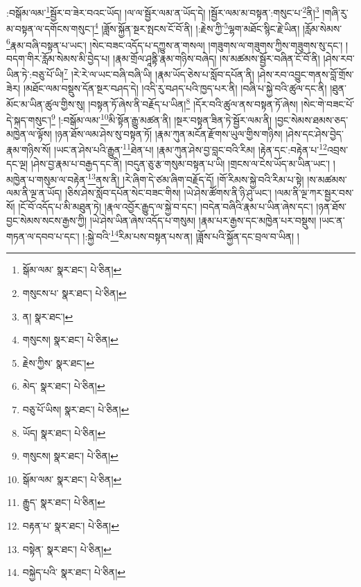:བསྒོམ་ལམ་\footnote{སྒོམ་ལམ་  སྣར་ཐང་།  པེ་ཅིན། }སྦྱོར་བ་ཟེར་བའང་ཡོད། །ལ་ལ་སྦྱོར་ལམ་ན་ཡོད་དེ། །སྦྱོར་ལམ་མ་བསྟན་:གསུང་པ་\footnote{གསུངས་པ་  སྣར་ཐང་།  པེ་ཅིན། }ནི།\footnote{ན།  སྣར་ཐང་། } །གཞི་རུ་མ་བསྟན་ལ་དགོངས་གསུང་།\footnote{གསུངས།  སྣར་ཐང་།  པེ་ཅིན། } །ཟློས་སྐྱོན་སྔར་སྤངས་ངོ་བོ་ནི། །:རྗེས་ཀྱི་\footnote{རྗེས་ཀྱིས་  སྣར་ཐང་། }ལྷག་མཐོང་སྙིང་རྗེ་ཡིན། །རློམ་སེམས་\footnote{མེད་  སྣར་ཐང་།  པེ་ཅིན། }རྣམ་བཞི་བསྟན་པ་ཡང་། །སེང་བཟང་འདོད་པ་དཀྱུས་ན་གསལ། །གཟུགས་ལ་གཟུགས་ཀྱིས་གཟུགས་སུ་དང་། །བདག་གིར་རློམ་སེམས་མི་བྱེད་པ། །རྣམ་གྲོལ་ཤཱནྟི་རྣམ་གཉིས་བཞེད། །ས་མཚམས་སྦྱོར་བཞིན་ངོ་བོ་ནི། །ཤེས་རབ་ཡིན་ཏེ་:བཅུ་པོ་ཡི།\footnote{བཅུ་པོ་ཡིས།  སྣར་ཐང་།  པེ་ཅིན། } །རེ་རེ་ལ་ཡང་བཞི་བཞི་ཡི། །རྣམ་ཡོད་ཅེས་པ་སློབ་དཔོན་ནི། །ཤེས་རབ་འབྱུང་གནས་བློ་གྲོས་ཟེར། །མཐོང་ལམ་བསྡུས་དོན་སྔར་བཤད་དེ། །འདི་རུ་བཤད་པའི་ཁྱད་པར་ནི། །བཞི་པ་སྐྱེ་བའི་ཚུལ་དང་ནི། །ཐུན་མོང་མ་ཡིན་ཚུལ་གྱིས་སུ། །བསྟན་ཏོ་ཞེས་ནི་བརྗོད་པ་ཡིན།\footnote{ཡོད།  སྣར་ཐང་།  པེ་ཅིན། } །དོར་བའི་ཚུལ་ནས་བསྟན་ཏོ་ཞེས། །སེང་གེ་བཟང་པོ་དེ་སྐད་གསུང་།\footnote{གསུངས།  སྣར་ཐང་།  པེ་ཅིན། } །:བསྒོམ་ལམ་\footnote{སྒོམ་ལམ་  སྣར་ཐང་།  པེ་ཅིན། }མི་སྟོན་རྒྱུ་མཚན་ནི། །སྔར་བསྟན་ཟིན་ཏེ་སྦྱོར་ལམ་ནི། །བྱང་སེམས་ཐམས་ཅད་མཁྱེན་ལ་ལྟོས། །ཉན་ཐོས་ལམ་ཤེས་སུ་བསྟན་ཏོ། །རྣམ་ཀུན་མངོན་རྫོགས་ཡུལ་གྱིས་གཉིས། །ཤེས་དང་ཤེས་བྱེད་རྣམ་གཉིས་སོ། །ཡང་ན་ཤེས་པའི་རྒྱུན་\footnote{རྒྱུད་  སྣར་ཐང་།  པེ་ཅིན། }ཐེན་པ། །རྣམ་ཀུན་ཤེས་བྱ་བླང་བའི་རིམ། །རྟེན་དང་:བརྟེན་པ་\footnote{བརྟན་པ་  སྣར་ཐང་།  པེ་ཅིན། }འབྲས་དང་ལྔ། །ཤེས་བྱ་རྣམ་པ་བརྒྱད་དང་ནི། །བདུན་ཅུ་རྩ་གསུམ་བསྟན་པ་ཡི། །གྲངས་ལ་ངེས་ཡོད་མ་ཡིན་ཡང་། །མཁྱེན་པ་གསུམ་ལ་བརྟེན་\footnote{བསྟེན་  སྣར་ཐང་།  པེ་ཅིན། }ནས་ནི། །རེ་ཞིག་དེ་ཙམ་ཞིག་བརྗོད་དོ། །གོ་རིམས་སྐྱེ་བའི་རིམ་པ་སྟེ། །ས་མཚམས་ལམ་ནི་ལྔ་ན་ཡོད། །ཅིས་ཤེས་སློབ་དཔོན་སེང་བཟང་གིས། །ཡེ་ཤེས་ཚོགས་ནི་ཉི་ཤུ་ཡང་། །ལམ་ནི་ལྔ་ཀར་སྦྱར་བས་སོ། །ངོ་བོ་འདོད་པ་མི་མཐུན་ཏེ། །རྣལ་འབྱོར་རྒྱུད་ལ་སྐྱེ་བ་དང་། །བདེན་བཞིའི་རྣམ་པ་ཡིན་ཞེས་དང་། །ཉན་ཐོས་བྱང་སེམས་སངས་རྒྱས་ཀྱི། །ཡེ་ཤེས་ཡིན་ཞེས་འདོད་པ་གསུམ། །རྣམ་པར་རྒྱས་དང་མཁྱེན་པར་བསྡུས། །ཡང་ན་གཏན་ལ་དབབ་པ་དང་། །:སྐྱེ་བའི་\footnote{བསྐྱེད་པའི་  སྣར་ཐང་།  པེ་ཅིན། }རིམ་པས་བསྟན་པས་ན། །ཟློས་པའི་སྐྱོན་དང་བྲལ་བ་ཡིན། །
